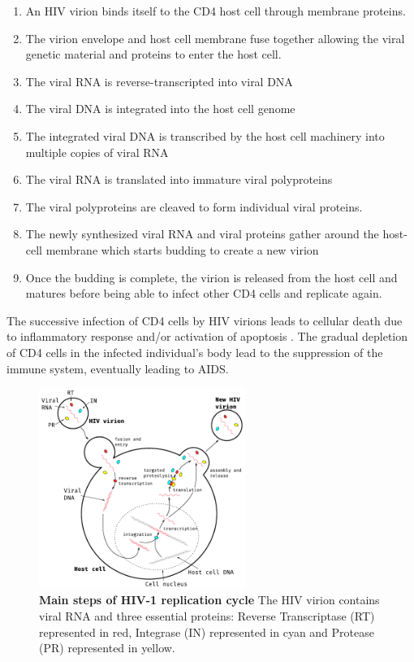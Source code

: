 \documentclass[
  11pt,
  twoside]{scrbook}
\newcommand{\extcaption}[2]{
    \caption[#1]{
        \textbf{#1}\newline
        #2
    }
}
\begin{document}
\begin{enumerate}
\def\labelenumi{\arabic{enumi}.}
\item
  An HIV virion binds itself to the CD4 host cell through membrane proteins.
\item
  The virion envelope and host cell membrane fuse together allowing the viral genetic material and proteins to enter the host cell.
\item
  The viral RNA is reverse-transcripted into viral DNA
\item
  The viral DNA is integrated into the host cell genome
\item
  The integrated viral DNA is transcribed by the host cell machinery into multiple copies of viral RNA
\item
  The viral RNA is translated into immature viral polyproteins
\item
  The viral polyproteins are cleaved to form individual viral proteins.
\item
  The newly synthesized viral RNA and viral proteins gather around the host-cell membrane which starts budding to create a new virion
\item
  Once the budding is complete, the virion is released from the host cell and matures before being able to infect other CD4 cells and replicate again.
\end{enumerate}

The successive infection of CD4 cells by HIV virions leads to cellular death due to inflammatory response and/or activation of apoptosis \autocite{gougeonDirectIndirectMechanisms1993,vidyavijayanPathophysiologyCD4TCell2017}. The gradual depletion of CD4 cells in the infected individual's body lead to the suppression of the immune system, eventually leading to AIDS.

\begin{figure}[h]
\centering
\includegraphics[width=0.6\textwidth]{./figures/HIV-Intro/HIV-cycle.pdf}
\extcaption{Main steps of HIV-1 replication cycle}{The HIV virion contains viral RNA and three essential proteins: Reverse Transcriptase (RT) represented in red, Integrase (IN) represented in cyan and Protease (PR) represented in yellow.}
\label{fig:hivCycle}
\end{figure}
\end{document}

